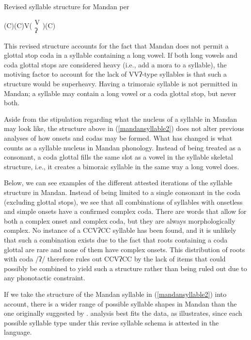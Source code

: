 \begin{exe}
\item\label{mandansyllable2} Revised syllable structure for Mandan per \citet[485]{carter1991a}

(C)(C)V($\substack{\text{V}\\\text{ʔ}}$)(C)

\end{exe}

This revised structure accounts for the fact that Mandan does not permit a glottal stop coda in a syllable containing a long vowel. If both long vowels and coda glottal stops are considered heavy (i.e., add a mora to a syllable), the motiving factor to account for the lack of VVʔ-type syllables is that such a structure would be superheavy. Having a trimoraic syllable is not permitted in Mandan; a syllable may contain a long vowel or a coda glottal stop, but never both.

Aside from the stipulation regarding what the nucleus of a syllable in Mandan may look like, the structure above in (\ref{mandansyllable2}) does not alter previous analyses of how onsets and codas may be formed. What has changed is what counts as a syllable nucleus in Mandan phonology. Instead of being treated as a consonant, a coda glottal fills the same slot as a vowel in the syllable skeletal structure, i.e., it creates a bimoraic syllable in the same way a long vowel does.

Below, we can see examples of the different attested iterations of the syllable structure in Mandan. Instead of being limited to a single consonant in the coda (excluding glottal stops), we see that all combinations of syllables with onsetless and simple onsets have a confirmed complex coda. There are words that allow for both a complex onset and complex coda, but they are always morphologically complex. No instance of a CCVʔCC syllable has been found, and it is unlikely that such a combination exists due to the fact that roots containing a coda glottal are rare and none of them have complex onsets. This distribution of roots with coda /ʔ/ therefore rules out CCVʔCC by the lack of items that could possibly be combined to yield such a structure rather than being ruled out due to any phonotactic constraint.

If we take the structure of the Mandan syllable in (\ref{mandansyllable2}) into account, there is a wider range of possible syllable shapes in Mandan than the one originally suggested by \citet[15]{hollow1970}.  analysis best fits the data, as  illustrates, since each possible syllable type under this revise syllable schema is attested in the language.



